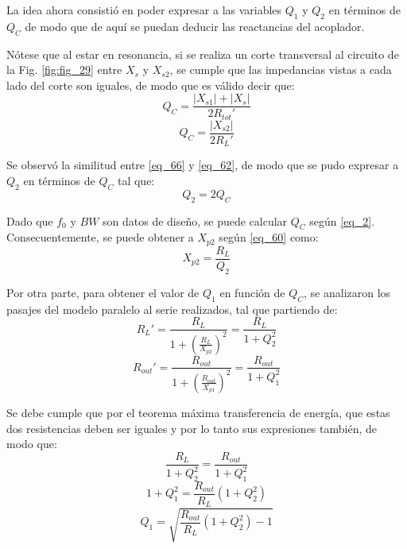\documentclass[conference]{IEEEtran}
\begin{document}
La idea ahora consistió en poder expresar a las variables $Q_{1}$ y $Q_{2}$ en términos de $Q_{C}$ de modo que de aquí se puedan deducir las reactancias del acoplador. 

Nótese que al estar en resonancia, si se realiza un corte transversal al circuito de la Fig. \ref{fig:fig_29} entre $X_{s}$ y $X_{s2}$, se cumple que las impedancias vistas a cada lado del corte son iguales, de modo que es válido decir que:
\begin{equation}
    Q_{C} = \frac{|X_{s1}| + |X_{s}|}{2R_{tot}'}
    \label{eq_65}
\end{equation}
\begin{equation}
    Q_{C} = \frac{|X_{s2}|}{2R_{L}'}
    \label{eq_66}
\end{equation}

Se observó la similitud entre \eqref{eq_66} y \eqref{eq_62}, de modo que se pudo expresar a $Q_{2}$ en términos de $Q_{C}$ tal que:
\begin{equation}
    Q_{2} = 2Q_{C}
    \label{eq_67}
\end{equation}

Dado que $f_{0}$ y $BW$ son datos de diseño, se puede calcular $Q_{C}$ según \eqref{eq_2}. Consecuentemente, se puede obtener a $X_{p2}$ según \eqref{eq_60} como:
\begin{equation}
    X_{p2} = \frac{R_L}{Q_2}
    \label{eq_68}
\end{equation}

Por otra parte, para obtener el valor de $Q_{1}$ en función de $Q_{C}$, se analizaron los pasajes del modelo paralelo al serie realizados, tal que partiendo de:
\begin{equation}
    R_{L}' = \frac{R_{L}}{1 + \left(\frac{R_{L}}{X_{p2}}\right)^{2}} = \frac{R_{L}}{1 + Q_{2}^{2}}
    \label{eq_69}
\end{equation}
\begin{equation}
    R_{out}' = \frac{R_{out}}{1 + \left(\frac{R_{out}}{X_{p1}}\right)^{2}} = \frac{R_{out}}{1 + Q_{1}^{2}}
    \label{eq_70}
\end{equation}

Se debe cumple que por el teorema máxima transferencia de energía, que estas dos resistencias deben ser iguales y por lo tanto sus expresiones también, de modo que:
\begin{equation}
    \frac{R_{L}}{1 + Q_{2}^{2}} = \frac{R_{out}}{1 + Q_{1}^{2}}
    \label{eq_71}
\end{equation}
\begin{equation}
    1 + Q_{1}^{2} = \frac{R_{out}}{R_{L}}(1 + Q_{2}^{2})
    \label{eq_72}
\end{equation}
\begin{equation}
    Q_{1} = \sqrt{\frac{R_{out}}{R_{L}}(1 + Q_{2}^{2}) - 1}
    \label{eq_73}
\end{equation}
\end{document}
